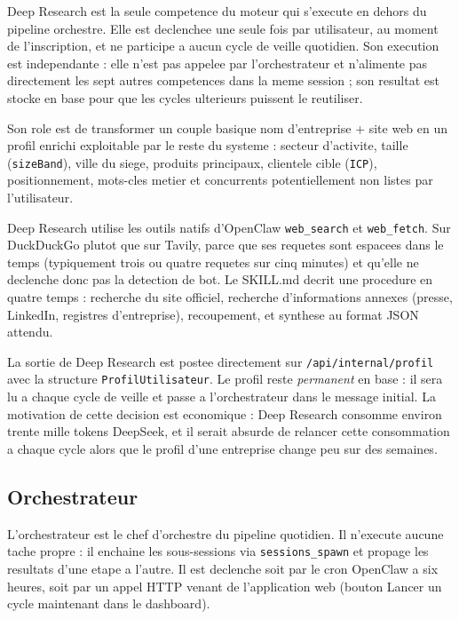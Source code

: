 \documentclass[12pt,a4paper,openany]{report}
\begin{document}
Deep Research est la seule competence du moteur qui s'execute en dehors du pipeline orchestre. Elle est declenchee une seule fois par utilisateur, au moment de l'inscription, et ne participe a aucun cycle de veille quotidien. Son execution est independante : elle n'est pas appelee par l'orchestrateur et n'alimente pas directement les sept autres competences dans la meme session ; son resultat est stocke en base pour que les cycles ulterieurs puissent le reutiliser.

Son role est de transformer un couple basique \og nom d'entreprise + site web \fg{} en un profil enrichi exploitable par le reste du systeme : secteur d'activite, taille (\texttt{sizeBand}), ville du siege, produits principaux, clientele cible (\texttt{ICP}), positionnement, mots-cles metier et concurrents potentiellement non listes par l'utilisateur.

Deep Research utilise les outils natifs d'OpenClaw \texttt{web\_search} et \texttt{web\_fetch}. Sur DuckDuckGo plutot que sur Tavily, parce que ses requetes sont espacees dans le temps (typiquement trois ou quatre requetes sur cinq minutes) et qu'elle ne declenche donc pas la detection de bot. Le SKILL.md decrit une procedure en quatre temps : recherche du site officiel, recherche d'informations annexes (presse, LinkedIn, registres d'entreprise), recoupement, et synthese au format JSON attendu.

La sortie de Deep Research est postee directement sur \texttt{/api/internal/profil} avec la structure \texttt{ProfilUtilisateur}. Le profil reste \emph{permanent} en base : il sera lu a chaque cycle de veille et passe a l'orchestrateur dans le message initial. La motivation de cette decision est economique : Deep Research consomme environ trente mille tokens DeepSeek, et il serait absurde de relancer cette consommation a chaque cycle alors que le profil d'une entreprise change peu sur des semaines.

\subsection{Orchestrateur}
\label{sec:skill-orchestrateur}

L'orchestrateur est le chef d'orchestre du pipeline quotidien. Il n'execute aucune tache propre : il enchaine les sous-sessions via \texttt{sessions\_spawn} et propage les resultats d'une etape a l'autre. Il est declenche soit par le cron OpenClaw a six heures, soit par un appel HTTP venant de l'application web (bouton \og Lancer un cycle maintenant \fg{} dans le dashboard).
\end{document}
